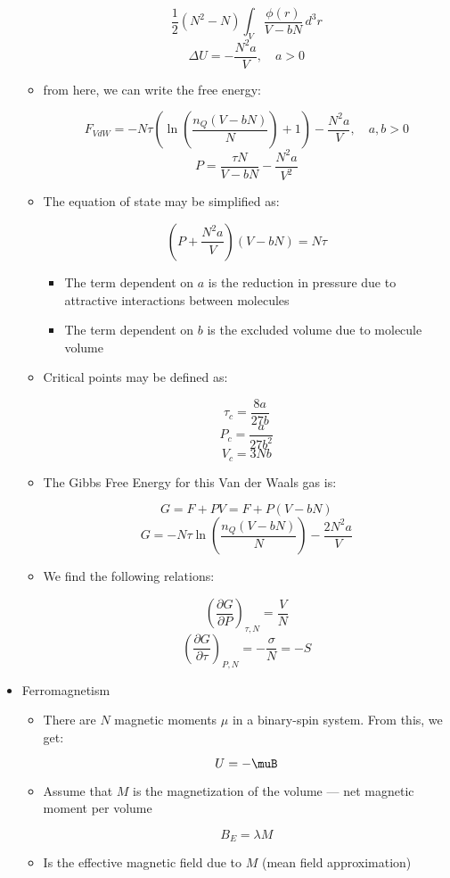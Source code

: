 \begin{itemize}
\begin{itemize}
        $$\frac{1}{2}(N^2-N)\int_V\frac{\phi(r)}{V-bN}\,d^3r$$
        $$\Delta U=-\frac{N^2a}{V},\quad a>0$$

      \item from here, we can write the free energy:

        $$F_{VdW}=-N\tau\left( \ln\left( \frac{n_Q(V-bN)}{N} \right)+1 \right)-\frac{N^2a}{V},\quad a,b>0$$
        $$P=\frac{\tau N}{V-bN}-\frac{N^2a}{V^2}$$

      \item The equation of state may be simplified as:

        $$\left( P+\frac{N^2a}{V} \right)(V-bN)=N\tau$$

        \begin{itemize}

          \item The term dependent on $a$ is the reduction in pressure due to attractive interactions between molecules

          \item The term dependent on $b$ is the excluded volume due to molecule volume

        \end{itemize}

      \item Critical points may be defined as:

        $$\tau_c=\frac{8a}{27b}$$
        $$P_c=\frac{a}{27b^2}$$
        $$V_c=3Nb$$

      \item The Gibbs Free Energy for this Van der Waals gas is:

        $$G=F+PV=F+P(V-bN)$$
        $$G=-N\tau\ln\left( \frac{n_Q(V-bN)}{N} \right)-\frac{2N^2a}{V}$$

      \item We find the following relations:

        $$\left( \frac{\partial G}{\partial P} \right)_{\tau,N}=\frac{V}{N}$$
        $$\left( \frac{\partial G}{\partial \tau} \right)_{P,N}=-\frac{\sigma}{N}=-S$$

    \end{itemize}

  \item Ferromagnetism

    \begin{itemize}

      \item There are $N$ magnetic moments $\mu$ in a binary-spin system. From this, we get:

        $$U=-\muB$$

      \item Assume that $M$ is the magnetization of the volume — net magnetic moment per volume

        $$B_E=\lambda M$$

      \item Is the effective magnetic field due to $M$ (mean field approximation)

    \end{itemize}

\end{itemize}





